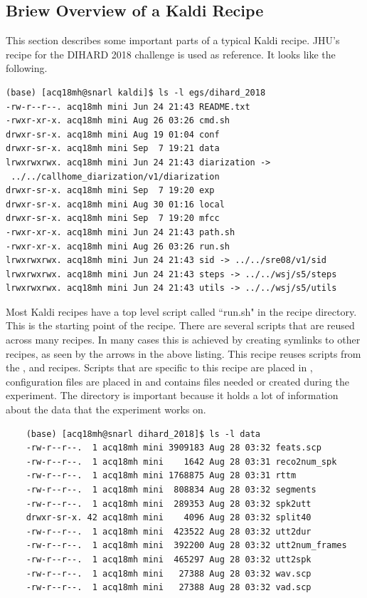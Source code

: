 	\subsection{Briew Overview of a Kaldi Recipe}
	This section describes some important parts of a typical Kaldi recipe. JHU's recipe for the DIHARD 2018 challenge  is used as reference. It looks like the following.
	
	\begin{verbatim}
(base) [acq18mh@snarl kaldi]$ ls -l egs/dihard_2018
-rw-r--r--. acq18mh mini Jun 24 21:43 README.txt
-rwxr-xr-x. acq18mh mini Aug 26 03:26 cmd.sh
drwxr-sr-x. acq18mh mini Aug 19 01:04 conf
drwxr-sr-x. acq18mh mini Sep  7 19:21 data
lrwxrwxrwx. acq18mh mini Jun 24 21:43 diarization ->
 ../../callhome_diarization/v1/diarization
drwxr-sr-x. acq18mh mini Sep  7 19:20 exp
drwxr-sr-x. acq18mh mini Aug 30 01:16 local
drwxr-sr-x. acq18mh mini Sep  7 19:20 mfcc
-rwxr-xr-x. acq18mh mini Jun 24 21:43 path.sh
-rwxr-xr-x. acq18mh mini Aug 26 03:26 run.sh
lrwxrwxrwx. acq18mh mini Jun 24 21:43 sid -> ../../sre08/v1/sid
lrwxrwxrwx. acq18mh mini Jun 24 21:43 steps -> ../../wsj/s5/steps
lrwxrwxrwx. acq18mh mini Jun 24 21:43 utils -> ../../wsj/s5/utils
	\end{verbatim}
	
	Most Kaldi recipes have a top level script called ``run.sh" in the recipe directory. This is the starting point of the recipe. There are several scripts that are reused across many recipes. In many cases this is achieved by creating symlinks to other recipes, as seen by the arrows in the above listing. This recipe reuses scripts from the ,  and  recipes. Scripts that are specific to this recipe are placed in , configuration files are placed in  and  contains files needed or created during the experiment. The  directory is important because it holds a lot of information about the data that the experiment works on.
	
	\begin{verbatim}
	(base) [acq18mh@snarl dihard_2018]$ ls -l data
	-rw-r--r--.  1 acq18mh mini 3909183 Aug 28 03:32 feats.scp
	-rw-r--r--.  1 acq18mh mini    1642 Aug 28 03:31 reco2num_spk
	-rw-r--r--.  1 acq18mh mini 1768875 Aug 28 03:31 rttm
	-rw-r--r--.  1 acq18mh mini  808834 Aug 28 03:32 segments
	-rw-r--r--.  1 acq18mh mini  289353 Aug 28 03:32 spk2utt
	drwxr-sr-x. 42 acq18mh mini    4096 Aug 28 03:32 split40
	-rw-r--r--.  1 acq18mh mini  423522 Aug 28 03:32 utt2dur
	-rw-r--r--.  1 acq18mh mini  392200 Aug 28 03:32 utt2num_frames
	-rw-r--r--.  1 acq18mh mini  465297 Aug 28 03:32 utt2spk
	-rw-r--r--.  1 acq18mh mini   27388 Aug 28 03:32 wav.scp
	-rw-r--r--.  1 acq18mh mini   27388 Aug 28 03:32 vad.scp
	\end{verbatim}
	
